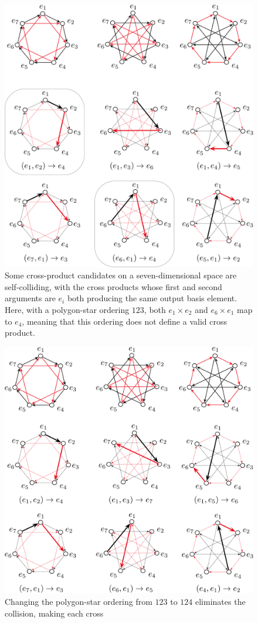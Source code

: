 \documentclass[11pt]{article}
\newcommand{\bv}[1][]{e_{#1}}
\begin{document}
\begin{figure}[htbp]
\begin{center}
\includegraphics[width=.85\textwidth]{Collisions7D.pdf}
\caption{Some cross-product candidates on a seven-dimensional space are self-colliding, with the cross products whose first and second arguments are $\bv[i]$ both producing the same output basis element. Here, with a polygon-star ordering $123$, both $\bv[1]\times\bv[2]$ and $\bv[6]\times\bv[1]$ map to $\bv[4]$, meaning that this ordering does not define a valid cross product.}
\label{fig:7collision}
\end{center}
\end{figure}

\begin{figure}[htbp]
\begin{center}
\includegraphics[width=.85\textwidth]{NoCollisions7D.pdf}
\caption{Changing the polygon-star ordering from $123$ to $124$ eliminates the collision, making each cross}
\label{fig:7nocollision}
\end{center}
\end{figure}
\end{document}
